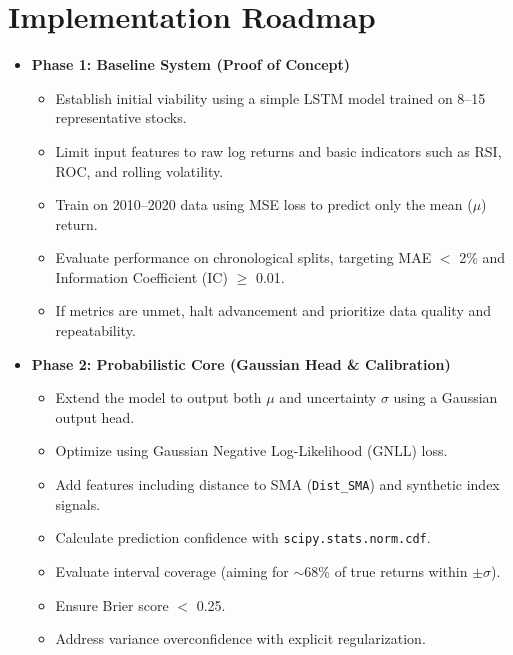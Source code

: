 \documentclass[twoside,final]{hcmut-report}
\begin{document}
\section{Implementation Roadmap}
\begin{itemize}
  \item \textbf{Phase 1: Baseline System (Proof of Concept)}
        \begin{itemize}
          \item Establish initial viability using a simple LSTM model trained on 8--15 representative stocks.
          \item Limit input features to raw log returns and basic indicators such as RSI, ROC, and rolling volatility.
          \item Train on 2010--2020 data using MSE loss to predict only the mean ($\mu$) return.
          \item Evaluate performance on chronological splits, targeting MAE $<$ 2\% and Information Coefficient (IC) $\geq$ 0.01.
          \item If metrics are unmet, halt advancement and prioritize data quality and repeatability.
        \end{itemize}

  \item \textbf{Phase 2: Probabilistic Core (Gaussian Head \& Calibration)}
        \begin{itemize}
          \item Extend the model to output both $\mu$ and uncertainty $\sigma$ using a Gaussian output head.
          \item Optimize using Gaussian Negative Log-Likelihood (GNLL) loss.
          \item Add features including distance to SMA (\texttt{Dist\_SMA}) and synthetic index signals.
          \item Calculate prediction confidence with \texttt{scipy.stats.norm.cdf}.
          \item Evaluate interval coverage (aiming for $\sim$68\% of true returns within $\pm\sigma$).
          \item Ensure Brier score $<$ 0.25.
          \item Address variance overconfidence with explicit regularization.
        \end{itemize}


\end{itemize}
\end{document}
